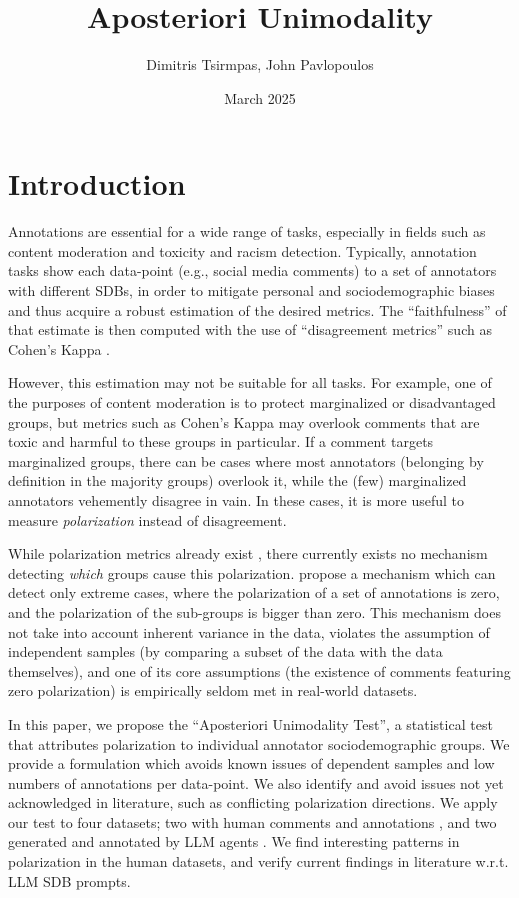 \documentclass{article}
\title{Aposteriori Unimodality}
\author{Dimitris Tsirmpas, John Pavlopoulos}
\date{March 2025}
\begin{document}
\maketitle


\section{Introduction}

Annotations are essential for a wide range of tasks, especially in fields such as content moderation and toxicity and racism detection. Typically, annotation tasks show each data-point (e.g., social media comments) to a set of annotators with different \acp{SDB}, in order to mitigate personal and sociodemographic biases and thus acquire a robust estimation of the desired metrics. The ``faithfulness'' of that estimate is then computed with the use of ``disagreement metrics'' such as Cohen's Kappa \cite{Cohen_1960}. 

However, this estimation may not be suitable for all tasks. For example, one of the purposes of content moderation is to protect marginalized or disadvantaged groups, but metrics such as Cohen's Kappa may overlook comments that are toxic and harmful to these groups in particular. If a comment targets marginalized groups, there can be cases where most annotators (belonging by definition in the majority groups) overlook it, while the (few) marginalized annotators vehemently disagree in vain. In these cases, it is more useful to measure \textit{polarization} instead of disagreement.

While polarization metrics already exist \parencite{Pavlopoulos2023, pavlopoulos-likas-2024}, there currently exists no mechanism detecting \textit{which} groups cause this polarization. \textcite{pavlopoulos-likas-2024} propose a mechanism which can detect only extreme cases, where the polarization of a set of annotations is zero, and the polarization of the sub-groups is bigger than zero. This mechanism does not take into account inherent variance in the data, violates the assumption of independent samples (by comparing a subset of the data with the data themselves), and one of its core assumptions (the existence of comments featuring zero polarization) is empirically seldom met in real-world datasets.

In this paper, we propose the ``Aposteriori Unimodality Test'', a statistical test that attributes polarization to individual annotator sociodemographic groups. We provide a formulation which avoids known issues of dependent samples and low numbers of annotations per data-point. We also identify and avoid issues not yet acknowledged in literature, such as conflicting polarization directions. We apply our test to four datasets; two with human comments and annotations \parencite{sap-etal-2022-annotators, kumar-et-al-2021}, and two generated and annotated by \ac{LLM} agents \cite{tsirmpas2025scalableevaluationonlinefacilitation}. We find interesting patterns in polarization in the human datasets, and verify current findings in literature w.r.t. \ac{LLM} \ac{SDB} prompts.
\end{document}
